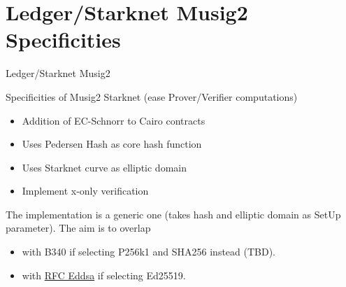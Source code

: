\documentclass[aspectratio=43]{beamer}
\begin{document}
\section{Ledger/Starknet Musig2 Specificities}



\begin{frame}{Ledger/Starknet Musig2}

Specificities of Musig2 Starknet (ease Prover/Verifier computations)
\begin{itemize}
\item Addition of EC-Schnorr to Cairo contracts
\item Uses Pedersen Hash as core hash function 
\item Uses Starknet curve as elliptic domain
\item Implement x-only verification
\end{itemize} 
The implementation is a generic one (takes hash and elliptic domain as SetUp parameter).
The aim is to overlap 
\begin{itemize}
\item with B340 if selecting P256k1 and SHA256 instead (TBD).
\item with \href{https://datatracker.ietf.org/doc/html/draft-irtf-cfrg-eddsa-05}{{\cyan RFC Eddsa}} if selecting Ed25519.        
\end{itemize}

     
\end{frame}
\end{document}
